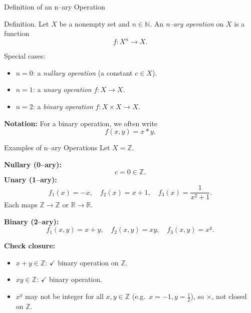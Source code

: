 
\date{15 October 2025}



\begin{frame}
  \cmctitleframe
\end{frame}

\begin{frame}{Definition of an n–ary Operation}
\begin{block}{Definition.}  
Let \( X \) be a nonempty set and \( n \in \mathbb{N} \).  
An \emph{n–ary operation} on \( X \) is a function
\[
f : X^n \longrightarrow X.
\]  
\end{block}

\begin{block}{Special cases:}
\begin{itemize}
  \item \( n = 0 \): a \emph{nullary operation} (a constant \( c \in X \)).
  \item \( n = 1 \): a \emph{unary operation} \( f: X \to X \).
  \item \( n = 2 \): a \emph{binary operation} \( f: X \times X \to X \).
\end{itemize}

\textbf{Notation:} For a binary operation, we often write  
\[
f(x,y) = x * y.
\]
    
\end{block}
\end{frame}

\begin{frame}{Examples of n–ary Operations}
\vspace{-0.3cm}
Let \( X = \mathbb{Z} \).

\textbf{Nullary (0–ary):}
\[
c = 0 \in \mathbb{Z}.
\]
\textbf{Unary (1–ary):}
\[
f_1(x) = -x, \quad f_2(x) = x + 1, \quad f_3(x) = \frac{1}{x^2 + 1}.
\]
Each maps \( \mathbb{Z} \to \mathbb{Z} \) or \( \mathbb{R} \to \mathbb{R} \).

\textbf{Binary (2–ary):}
\[
f_1(x,y) = x + y, \quad f_2(x,y) = xy, \quad f_3(x,y) = x^y.
\]

\textbf{Check closure:}
\begin{itemize}
  \item \(x+y \in \mathbb{Z}\): $\checkmark$ binary operation on \(\mathbb{Z}\).
  \item \(xy \in \mathbb{Z}\): $\checkmark$ binary operation.
  \item \(x^y\) may not be integer for all \(x,y\in\mathbb{Z}\) (e.g.\ \(x=-1, y=\frac12\)), so $\times$, not closed on \(\mathbb{Z}\).
\end{itemize}
\end{frame}

